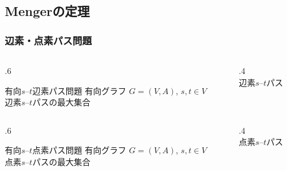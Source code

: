 \documentclass[14pt,aspectratio=169,xcolor=dvipsnames,table,onlytextwidth,dvipdfmx]{beamer}
\begin{document}
\subsection{Mengerの定理}
\begin{frame}
    \frametitle{辺素・点素パス問題}

    \begin{columns}[T]
    \begin{column}{.6\textwidth}
    \begin{block}{有向$s$--$t$辺素パス問題}
         有向グラフ $G = (V, A)$, $s, t \in V$  \\
         辺素$s$--$t$パスの最大集合
    \end{block}
    \end{column}
    \begin{column}{.4\textwidth}
        \centering
         \\
        辺素$s$--$t$パス
    \end{column}
    \end{columns}

    \vfill\pause
    \begin{columns}[T]
    \begin{column}{.6\textwidth}
    \begin{block}{有向$s$--$t$点素パス問題}
         有向グラフ $G = (V, A)$, $s, t \in V$  \\
         点素$s$--$t$パスの最大集合
    \end{block}
    \end{column}
    \begin{column}{.4\textwidth}
        \centering
         \\
        点素$s$--$t$パス
    \end{column}
    \end{columns}
\end{frame}

\end{document}
